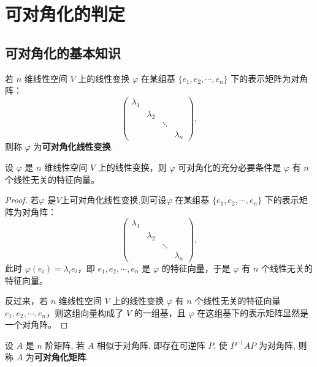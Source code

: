 \documentclass[../../main.tex]{subfiles}%
\begin{document}
\section{可对角化的判定}

\subsection{可对角化的基本知识}

\begin{definition}[可对角化线性变换]
若 $n$ 维线性空间 $V$ 上的线性变换 $\varphi$ 在某组基 $\{e_1, e_2, \cdots, e_n\}$ 下的表示矩阵为对角阵：
\[
\begin{pmatrix}
\lambda_1 & & & \\
& \lambda_2 & & \\
& & \ddots & \\
& & & \lambda_n
\end{pmatrix},
\]
则称 $\varphi$ 为\textbf{可对角化线性变换}.
\end{definition}

\begin{theorem}[线性变换可对角化的充要条件]\label{theorem:线性变换可对角化的充要条件}
设 $\varphi$ 是 $n$ 维线性空间 $V$ 上的线性变换，则 $\varphi$ 可对角化的充分必要条件是 $\varphi$ 有 $n$ 个线性无关的特征向量。
\end{theorem}
\begin{proof}

若$\varphi$ 是$V$上可对角化线性变换,则可设$\varphi$ 在某组基 $\{e_1, e_2, \cdots, e_n\}$ 下的表示矩阵为对角阵：
\[
\begin{pmatrix}
\lambda_1 & & & \\
& \lambda_2 & & \\
& & \ddots & \\
& & & \lambda_n
\end{pmatrix},
\]
此时 $\varphi(e_i) = \lambda_i e_i$，即 $e_1, e_2, \cdots, e_n$ 是 $\varphi$ 的特征向量，于是 $\varphi$ 有 $n$ 个线性无关的特征向量。

反过来，若 $n$ 维线性空间 $V$ 上的线性变换 $\varphi$ 有 $n$ 个线性无关的特征向量 $e_1, e_2, \cdots, e_n$，则这组向量构成了 $V$ 的一组基，且 $\varphi$ 在这组基下的表示矩阵显然是一个对角阵。

\end{proof}

\begin{definition}[可对角化矩阵]
设 $A$ 是 $n$ 阶矩阵, 若 $A$ 相似于对角阵, 即存在可逆阵 $P$, 使 $P^{-1}AP$ 为对角阵, 则称 $A$ 为\textbf{可对角化矩阵}.
\end{definition}
\end{document}
